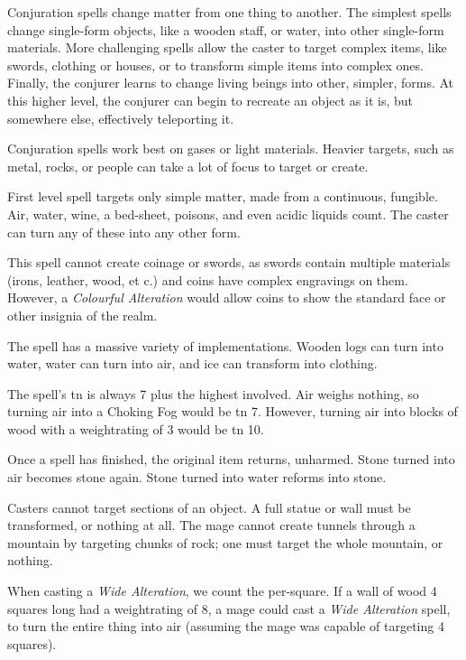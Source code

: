 \begin{multicols}{2}

\noindent
Conjuration spells change matter from one thing to another.
The simplest spells change single-form objects, like a wooden staff, or water, into other single-form materials.
More challenging spells allow the caster to target complex items, like swords, clothing or houses, or to transform simple items into complex ones.
Finally, the conjurer learns to change living beings into other, simpler, forms.
At this higher level, the conjurer can begin to recreate an object as it is, but somewhere else, effectively teleporting it.

Conjuration spells work best on gases or light materials.
Heavier targets, such as metal, rocks, or people can take a lot of focus to target or create.

\spelllevel

First level spell targets only simple matter, made from a continuous, fungible.
Air, water, wine, a bed-sheet, poisons, and even acidic liquids count.
The caster can turn any of these into any other form.

This spell cannot create coinage or swords, as swords contain multiple materials (irons, leather, wood, et c.) and coins have complex engravings on them.
However, a \textit{Colourful Alteration} would allow coins to show the standard face or other insignia of the realm.

The spell has a massive variety of implementations.
Wooden logs can turn into water, water can turn into air, and ice can transform into clothing.

The spell's \gls{tn} is always 7 plus the highest  involved.
Air weighs nothing, so turning air into a Choking Fog would be \gls{tn} 7.
However, turning air into blocks of wood with a \gls{weightrating} of 3 would be \gls{tn} 10.

Once a spell has finished, the original item returns, unharmed.
Stone turned into air becomes stone again.
Stone turned into water reforms into stone.

Casters cannot target sections of an object.
A full statue or wall must be transformed, or nothing at all.
The mage cannot create tunnels through a mountain by targeting chunks of rock; one must target the whole mountain, or nothing.

When casting a \textit{Wide Alteration}, we count the  per-square.
If a wall of wood 4 squares long had a \gls{weightrating} of 8, a mage could cast a \textit{Wide Alteration} spell, to turn the entire thing into air (assuming the mage was capable of targeting 4 squares).


\end{multicols}
